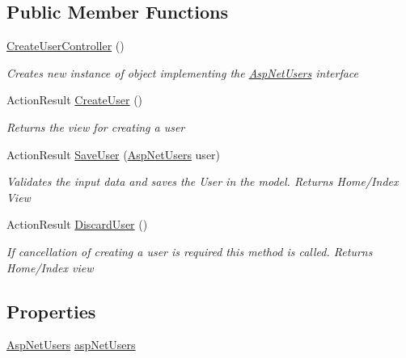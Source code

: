 \subsection*{Public Member Functions}
\begin{DoxyCompactItemize}
\item 
\hyperlink{class_website_1_1_controllers_1_1_create_user_controller_afb7bcee4e39baf32c7bb9cece2ad2554}{Create\+User\+Controller} ()
\begin{DoxyCompactList}\small\item\em Creates new instance of object implementing the \hyperlink{class_website_1_1_asp_net_users}{Asp\+Net\+Users} interface \end{DoxyCompactList}\item 
Action\+Result \hyperlink{class_website_1_1_controllers_1_1_create_user_controller_ab4a632762972b1d40556a8fdca22c925}{Create\+User} ()
\begin{DoxyCompactList}\small\item\em Returns the view for creating a user \end{DoxyCompactList}\item 
Action\+Result \hyperlink{class_website_1_1_controllers_1_1_create_user_controller_a7a0b659bd5d9e246e3c19c6732345fc6}{Save\+User} (\hyperlink{class_website_1_1_asp_net_users}{Asp\+Net\+Users} user)
\begin{DoxyCompactList}\small\item\em Validates the input data and saves the User in the model. Returns Home/\+Index View \end{DoxyCompactList}\item 
Action\+Result \hyperlink{class_website_1_1_controllers_1_1_create_user_controller_aacefab3975ca3fcfc6f83d40639b192a}{Discard\+User} ()
\begin{DoxyCompactList}\small\item\em If cancellation of creating a user is required this method is called. Returns Home/\+Index view \end{DoxyCompactList}\end{DoxyCompactItemize}
\subsection*{Properties}
\begin{DoxyCompactItemize}
\item 
\hyperlink{class_website_1_1_asp_net_users}{Asp\+Net\+Users} \hyperlink{class_website_1_1_controllers_1_1_create_user_controller_ad1a8943beca097e6dd6041c5b598748a}{asp\+Net\+Users}
\end{DoxyCompactItemize}


